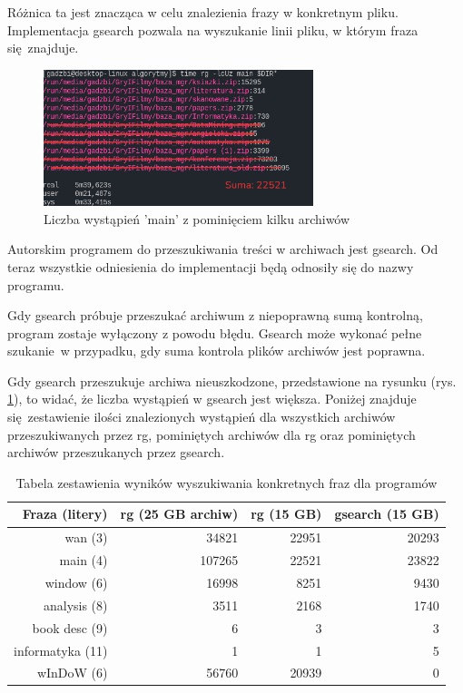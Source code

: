 Różnica ta jest znacząca w celu znalezienia frazy w konkretnym pliku. 
Implementacja gsearch pozwala na wyszukanie linii pliku, w którym fraza się znajduje. 

\begin{figure}[htbp]
\centering
\includegraphics[width=0.7\textwidth]{./images/rgSkippedmain.png}
\caption{Liczba wystąpień 'main' z pominięciem kilku archiwów}
\label{fig:ripgrepRemoveSkipped}
\end{figure}

Autorskim programem do przeszukiwania treści w archiwach jest gsearch. Od teraz
wszystkie odniesienia do implementacji będą odnosiły się do nazwy programu.

Gdy gsearch próbuje przeszukać archiwum z niepoprawną sumą kontrolną, program
zostaje wyłączony z powodu błędu. Gsearch może wykonać pełne szukanie w przypadku,
gdy suma kontrola plików archiwów jest poprawna.

Gdy gsearch przeszukuje archiwa nieuszkodzone, przedstawione na rysunku (rys. \ref{fig:ripgrepRemoveSkipped}),
to widać, że liczba wystąpień w gsearch jest większa. Poniżej znajduje się zestawienie
ilości znalezionych wystąpień dla wszystkich archiwów przeszukiwanych przez rg,
pominiętych archiwów dla rg oraz pominiętych archiwów przeszukanych przez gsearch.

\begin{table}[htbp]
    \centering
    \begin{tabular}{|r|r|r|r|}
        \hline
        \textbf{Fraza (litery)} & \textbf{rg (25 GB archiw)} & \textbf{rg (15 GB)} &  \textbf{gsearch (15 GB)} \\
        \hline
        wan (3) & 34821 & 22951 & 20293 \\
        \hline
        main (4) & 107265 & 22521 & 23822 \\
        \hline
        window (6) & 16998 & 8251 & 9430 \\
        \hline
        analysis (8) & 3511 & 2168 & 1740 \\
        \hline
        book desc (9) & 6 & 3 & 3 \\
        \hline
        informatyka (11) & 1 & 1 & 5 \\
        \hline
        wInDoW (6) & 56760 & 20939 & 0 \\
        \hline
    \end{tabular}
    \caption{Tabela zestawienia wyników wyszukiwania konkretnych fraz dla programów}
    \label{tabela:iloscWyszukanDziekiProgramom}
\end{table}

